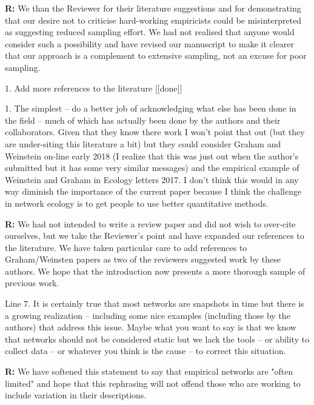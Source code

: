 \documentclass[12pt]{letter}
\newenvironment{refquote}{\bigskip \begin{it}}{\end{it}\smallskip}
\begin{document}
		\textbf{R:} We than the Reviewer for their literature suggestions and for demonstrating that our desire not to criticise hard-working empiricists could be misinterpreted as suggesting reduced sampling effort. We had not realised that anyone would consider such a possibility and have revised our manuscript to make it clearer that our approach is a complement to extensive sampling, not an excuse for poor sampling. 


	1. Add more references to the literature [[done]]

		\begin{refquote}
		1.      The simplest – do a better job of acknowledging what else has been done in the field – much of which has actually been done by the authors and their collaborators.  Given that they know there work I won’t point that out (but they are under-siting this literature a bit) but they could consider Graham and Weinstein on-line early 2018 (I realize that this was just out when the author’s submitted but it has some very similar messages) and the empirical example of Weinstein and Graham in Ecology letters 2017.  I don’t think this would in any way diminish the importance of the current paper because I think the challenge in network ecology is to get people to use better quantitative methods.
		\end{refquote}

		\textbf{R:} We had not intended to write a review paper and did not wish to over-cite ourselves, but we take the Reviewer's point and have expanded our references to the literature. We have taken particular care to add references to Graham/Weinsten papers as two of the reviewers suggested work by these authors. We hope that the introduction now presents a more thorough sample of previous work.

		\begin{refquote}
		Line 7.  It is certainly true that most networks are snapshots in time but there is a growing realization – including some nice examples (including those by the authors) that address this issue.  Maybe what you want to say is that we know that networks should not be considered static but we lack the tools – or ability to collect data – or whatever you think is the cause – to correct this situation. 
		\end{refquote}

		\textbf{R:} We have softened this statement to say that empirical networks are "often limited" and hope that this rephrasing will not offend those who are working to include variation in their descriptions.
\end{document}
